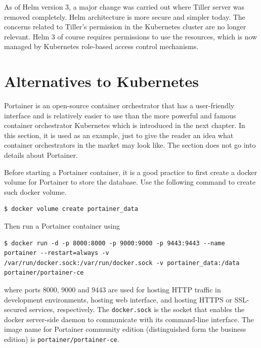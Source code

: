 As of Helm version 3, a major change was carried out where Tiller server was removed completely. Helm architecture is more secure and simpler today. The concerns related to Tiller's permission in the Kubernetes cluster are no longer relevant. Helm 3 of course requires permissions to use the resources, which is now managed by Kubernetes role-based access control mechanisms.

\section{Alternatives to Kubernetes}

Portainer is an open-source container orchestrator that has a user-friendly interface and is relatively easier to use than the more powerful and famous container orchestrator Kubernetes which is introduced in the next chapter. In this section, it is used as an example, just to give the reader an idea what container orchestrators in the market may look like. The section does not go into details about Portainer.

Before starting a Portainer container, it is a good practice to first create a docker volume for Portainer to store the database. Use the following command to create such docker volume.
\begin{lstlisting}
$ docker volume create portainer_data
\end{lstlisting}
Then run a Portainer container using
\begin{lstlisting}
$ docker run -d -p 8000:8000 -p 9000:9000 -p 9443:9443 --name portainer --restart=always -v /var/run/docker.sock:/var/run/docker.sock -v portainer_data:/data portainer/portainer-ce
\end{lstlisting}
where ports 8000, 9000 and 9443 are used for hosting HTTP traffic in development environments, hosting web interface, and hosting HTTPS or SSL-secured services, respectively. The \verb|docker.sock| is the socket that enables the docker server-side daemon to communicate with its command-line interface. The image name for Portainer community edition (distinguished form the business edition) is \verb|portainer/portainer-ce|.

